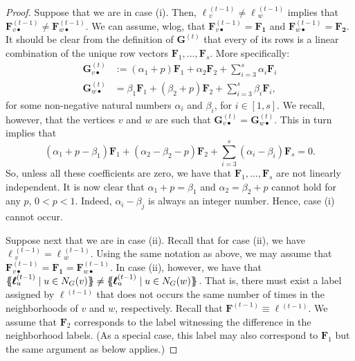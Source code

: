 \begin{proof}
Suppose that we are in case (i). Then,  $\pmb{\ell}{}^{(t-1)}_v\neq\pmb{\ell}{}^{(t-1)}_w$ implies that
	$\mathbf{F}^{(t-1)}_{v\bullet}\neq \mathbf{F}^{(t-1)}_{w\bullet}$. We can assume, wlog, that $\mathbf{F}^{(t-1)}_{v\bullet}=\mathbf{F_1}$ and
	$\mathbf{F}^{(t-1)}_{w\bullet}=\mathbf{F_2}$. It should be clear from the definition of $\mathbf{G}^{(t)}$ that every of its rows is a linear combination of 
	the unique row vectors $\mathbf{F}_1,\ldots,\mathbf{F}_s$. More specifically:
	\begin{align*}
	\mathbf{G}^{(t)}_{v\bullet}&:=(\alpha_1+p)\mathbf{F}_1+ \alpha_2\mathbf{F}_2+ \sum_{i=3}^s \alpha_i\mathbf{F}_i\\
	\mathbf{G}^{(t)}_{w\bullet}&=\beta_1\mathbf{F}_1+ (\beta_2+p)\mathbf{F}_2+ \sum_{i=3}^s \beta_i\mathbf{F}_i,
	\end{align*}
	for some non-negative natural numbers $\alpha_i$ and $\beta_i$, for $i\in[1,s]$.
We recall, however, that the vertices $v$ and $w$ are such that $\mathbf{G}^{(t)}_{v\bullet}=\mathbf{G}^{(t)}_{w\bullet}$. This in turn implies that
	$$
	(\alpha_1+p-\beta_1)\mathbf{F}_1 + (\alpha_2-\beta_2-p)\mathbf{F}_2 +\sum_{i=3}^s (\alpha_i-\beta_i)\mathbf{F}_s=0.
	$$
	So, unless all these coefficients are zero, we have that $\mathbf{F}_1,\ldots,\mathbf{F}_s$
	are not linearly independent. It is now clear that $\alpha_1+p=\beta_1$ and
	$\alpha_2=\beta_2+p$ cannot hold for any $p$, $0<p<1$. Indeed, $\alpha_i-\beta_j$
	is always an integer number. Hence, case (i) cannot occur.
	

Suppose next that we are in case (ii). Recall that for case (ii), we have $\pmb{\ell}{}^{(t-1)}_v=\pmb{\ell}{}^{(t-1)}_w$.
	Using the same notation as above, we may assume that $\mathbf{F}^{(t-1)}_{v\bullet}=\mathbf{F_1}=\mathbf{F}^{(t-1)}_{w\bullet}$. In case (ii), however, we have that
	$
	\ldbl \pmb{\ell}{}^{(t-1)}_{u} \st u \in N_G(v) \rdbl\neq
	\ldbl \pmb{\ell}{}^{(t-1)}_{u} \st u \in N_G(w) \rdbl
	$.
	That is, there must exist a label assigned by $\pmb{\ell}{}^{(t-1)}$ that does not occurs the same number of times in the neighborhoods of $v$ and $w$, respectively. Recall that $\mathbf{F}^{(t-1)}\equiv \pmb{\ell}{}^{(t-1)}$. We assume that $\mathbf{F}_2$ corresponds to the label witnessing the difference in the neighborhood labels. (As a special case, this label may also correspond to $\mathbf{F}_1$ but the same argument as below applies.)


\end{proof}
